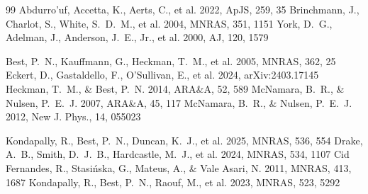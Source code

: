\documentclass[twocolumn]{aastex702}
\begin{document}
\begin{thebibliography}{99}
 Abdurro'uf, Accetta, K., Aerts, C., et al. 2022, ApJS, 259, 35
 Brinchmann, J., Charlot, S., White, S.~D.~M., et al. 2004, MNRAS, 351, 1151
 York, D.~G., Adelman, J., Anderson, J.~E., Jr., et al. 2000, AJ, 120, 1579

 Best, P.~N., Kauffmann, G., Heckman, T.~M., et al. 2005, MNRAS, 362, 25
 Eckert, D., Gastaldello, F., O'Sullivan, E., et al. 2024, arXiv:2403.17145
 Heckman, T.~M., \& Best, P.~N. 2014, ARA\&A, 52, 589
 McNamara, B.~R., \& Nulsen, P.~E.~J. 2007, ARA\&A, 45, 117
 McNamara, B.~R., \& Nulsen, P.~E.~J. 2012, New J. Phys., 14, 055023

 Kondapally, R., Best, P.~N., Duncan, K.~J., et al. 2025, MNRAS, 536, 554
 Drake, A.~B., Smith, D.~J.~B., Hardcastle, M.~J., et al. 2024, MNRAS, 534, 1107
 Cid Fernandes, R., Stasińska, G., Mateus, A., \& Vale Asari, N. 2011, MNRAS, 413, 1687
 Kondapally, R., Best, P.~N., Raouf, M., et al. 2023, MNRAS, 523, 5292
\end{thebibliography}
\end{document}
